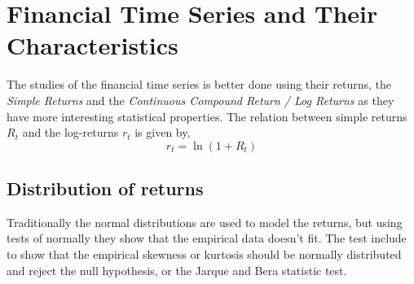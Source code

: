 \section{Financial Time Series and Their Characteristics}

The studies of the financial time series is better done using their returns,
the \textit{Simple Returns} and the \textit{Continuous Compound Return / Log Returns} as they have more interesting statistical properties.
The relation between simple returns $R_t$ and the log-returns $r_t$ is given by,
\begin{equation*}
    r_t = \ln(1 + R_t)
\end{equation*}

\subsection{Distribution of returns}

Traditionally the normal distributions are used to model the returns,
but using tests of normally they show that the empirical data doesn't fit.
The test include to show that the empirical skewness or kurtosis should be normally distributed and reject the null hypothesis,
or the Jarque and Bera statistic test.